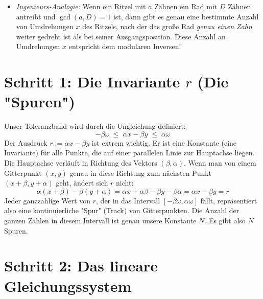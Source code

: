 \documentclass[11pt]{article}
\begin{document}
\begin{enumerate}
\begin{itemize}
        \item \textit{Ingenieurs-Analogie:} Wenn ein Ritzel mit $a$ Zähnen ein Rad mit $D$ Zähnen antreibt und $\gcd(a,D)=1$ ist, dann gibt es genau eine bestimmte Anzahl von Umdrehungen $x$ des Ritzels, nach der das große Rad \textit{genau einen Zahn} weiter gedreht ist als bei seiner Ausgangsposition. Diese Anzahl an Umdrehungen $x$ entspricht dem modularen Inversen!
    \end{itemize}
\end{enumerate}

\section{Schritt 1: Die Invariante $r$ (Die "Spuren")}

Unser Toleranzband wird durch die Ungleichung definiert:
\[
    -\beta\omega \;\le\; \alpha x - \beta y \;\le\; \alpha\omega
\]
Der Ausdruck $r := \alpha x - \beta y$ ist extrem wichtig. Er ist eine Konstante (eine Invariante) für alle Punkte, die auf einer parallelen Linie zur Hauptachse liegen. Die Hauptachse verläuft in Richtung des Vektors $(\beta, \alpha)$. Wenn man von einem Gitterpunkt $(x,y)$ genau in diese Richtung zum nächsten Punkt $(x+\beta, y+\alpha)$ geht, ändert sich $r$ nicht:
\[
    \alpha(x+\beta) - \beta(y+\alpha) = \alpha x + \alpha\beta - \beta y - \beta\alpha = \alpha x - \beta y = r
\]
Jeder ganzzahlige Wert von $r$, der in das Intervall $[-\beta\omega, \alpha\omega]$ fällt, repräsentiert also eine kontinuierliche "Spur" (Track) von Gitterpunkten. Die Anzahl der ganzen Zahlen in diesem Intervall ist genau unsere Konstante $N$. Es gibt also $N$ Spuren.

\section{Schritt 2: Das lineare Gleichungssystem}
\end{document}
